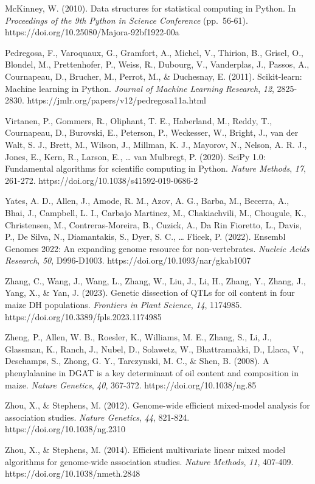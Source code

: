 \documentclass[
]{article}
\begin{document}
McKinney, W. (2010). Data structures for statistical computing in
Python. In \emph{Proceedings of the 9th Python in Science Conference}
(pp.~56-61). https://doi.org/10.25080/Majora-92bf1922-00a

Pedregosa, F., Varoquaux, G., Gramfort, A., Michel, V., Thirion, B.,
Grisel, O., Blondel, M., Prettenhofer, P., Weiss, R., Dubourg, V.,
Vanderplas, J., Passos, A., Cournapeau, D., Brucher, M., Perrot, M., \&
Duchesnay, E. (2011). Scikit-learn: Machine learning in Python.
\emph{Journal of Machine Learning Research}, \emph{12}, 2825-2830.
https://jmlr.org/papers/v12/pedregosa11a.html

Virtanen, P., Gommers, R., Oliphant, T. E., Haberland, M., Reddy, T.,
Cournapeau, D., Burovski, E., Peterson, P., Weckesser, W., Bright, J.,
van der Walt, S. J., Brett, M., Wilson, J., Millman, K. J., Mayorov, N.,
Nelson, A. R. J., Jones, E., Kern, R., Larson, E., \ldots{} van
Mulbregt, P. (2020). SciPy 1.0: Fundamental algorithms for scientific
computing in Python. \emph{Nature Methods}, \emph{17}, 261-272.
https://doi.org/10.1038/s41592-019-0686-2

Yates, A. D., Allen, J., Amode, R. M., Azov, A. G., Barba, M., Becerra,
A., Bhai, J., Campbell, L. I., Carbajo Martinez, M., Chakiachvili, M.,
Chougule, K., Christensen, M., Contreras-Moreira, B., Cuzick, A., Da Rin
Fioretto, L., Davis, P., De Silva, N., Diamantakis, S., Dyer, S. C.,
\ldots{} Flicek, P. (2022). Ensembl Genomes 2022: An expanding genome
resource for non-vertebrates. \emph{Nucleic Acids Research}, \emph{50},
D996-D1003. https://doi.org/10.1093/nar/gkab1007

Zhang, C., Wang, J., Wang, L., Zhang, W., Liu, J., Li, H., Zhang, Y.,
Zhang, J., Yang, X., \& Yan, J. (2023). Genetic dissection of QTLs for
oil content in four maize DH populations. \emph{Frontiers in Plant
Science}, \emph{14}, 1174985. https://doi.org/10.3389/fpls.2023.1174985

Zheng, P., Allen, W. B., Roesler, K., Williams, M. E., Zhang, S., Li,
J., Glassman, K., Ranch, J., Nubel, D., Solawetz, W., Bhattramakki, D.,
Llaca, V., Deschamps, S., Zhong, G. Y., Tarczynski, M. C., \& Shen, B.
(2008). A phenylalanine in DGAT is a key determinant of oil content and
composition in maize. \emph{Nature Genetics}, \emph{40}, 367-372.
https://doi.org/10.1038/ng.85

Zhou, X., \& Stephens, M. (2012). Genome-wide efficient mixed-model
analysis for association studies. \emph{Nature Genetics}, \emph{44},
821-824. https://doi.org/10.1038/ng.2310

Zhou, X., \& Stephens, M. (2014). Efficient multivariate linear mixed
model algorithms for genome-wide association studies. \emph{Nature
Methods}, \emph{11}, 407-409. https://doi.org/10.1038/nmeth.2848
\end{document}
